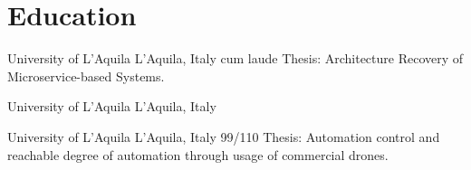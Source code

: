 \documentclass[10pt,a4paper,sans]{moderncv}
\begin{document}
\section{Education}
{University of L'Aquila}
{L'Aquila, Italy}
{cum laude}{
Thesis: Architecture Recovery of Microservice-based Systems.
}

{University of L'Aquila}
{L'Aquila, Italy}
{}{}

{University of L'Aquila}
{L'Aquila, Italy}
{99/110}{
Thesis: Automation control and reachable degree of automation through usage of commercial drones.
}
\end{document}
